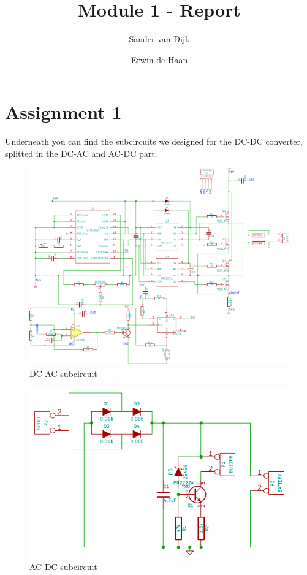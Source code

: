 \documentclass[final]{scrreprt} %
\title{Module 1 - Report}
\author{Sander {van Dijk} \and Erwin {de Haan}}
\begin{document}
\chapter{Assignment 1}
Underneath you can find the subcircuits we designed for the DC-DC converter, splitted in the DC-AC and AC-DC part.

\begin{figure}[h]
	\label{fig:DC-AC}
	\includegraphics[width=\linewidth]{resources/DC-AC-rc.pdf}
	\caption{DC-AC subcircuit}
\end{figure}

\begin{figure}[h]
	\label{fig:AC-DC}
	\includegraphics[width=\linewidth]{resources/AC-DC-rc.pdf}
	\caption{AC-DC subcircuit}
\end{figure}
\end{document}
